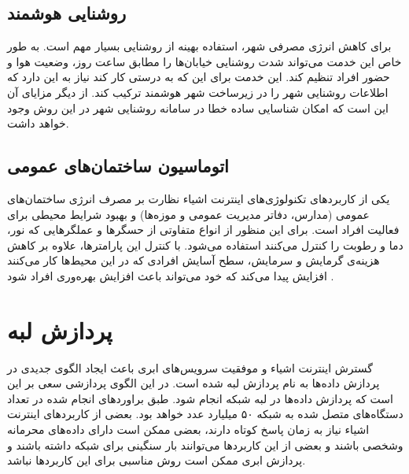     \subsection{روشنایی هوشمند}
      برای کاهش انرژی مصرفی شهر، استفاده بهینه از روشنایی بسیار مهم است.
      به طور خاص این خدمت می‌تواند شدت روشنایی خیابان‌ها را مطابق ساعت روز، وضعیت هوا و حضور افراد تنظیم کند.
      این خدمت برای این که به درستی کار کند نیاز به این دارد که اطلاعات روشنایی شهر را در زیرساخت شهر هوشمند ترکیب کند.
      از دیگر مزایای آن این است که امکان شناسایی ساده خطا در سامانه روشنایی شهر در این روش وجود خواهد داشت.

    \subsection{اتوماسیون ساختمان‌های عمومی}
      یکی از کاربرد‌های تکنولوژی‌های اینترنت اشیاء نظارت بر مصرف انرژی ساختمان‌های عمومی (مدارس، دفاتر مدیریت عمومی و موزه‌ها) و بهبود شرایط محیطی برای فعالیت افراد است.
      برای این منظور از انواع متفاوتی از حسگر‌ها و عملگر‌هایی که نور، دما و رطوبت را کنترل می‌کنند استفاده می‌شود.
      با کنترل این پارامتر‌ها، علاوه بر کاهش هزینه‌ی گرمایش و سرمایش، سطح آسایش افرادی که در این محیط‌ها کار می‌کنند افزایش پیدا می‌کند که خود می‌تواند باعث افزایش بهره‌وری افراد شود \cite{lee2008intelligent}.

  \section{پردازش لبه}
    گسترش اینترنت اشیاء و موفقیت سرویس‌های ابری باعث ایجاد الگو‌ی جدیدی در پردازش داده‌ها به نام پردازش لبه  شده است.
    در این الگوی پردازشی سعی بر این است که پردازش داده‌ها در لبه شبکه انجام شود.
    طبق براورد‌های انجام شده در \cite{2018cisco} تعداد دستگاه‌های متصل شده به شبکه ۵۰ میلیارد عدد خواهد بود.
    بعضی از کاربردهای اینترنت اشیاء نیاز به زمان پاسخ کوتاه دارند، بعضی ممکن است دارای داده‌های محرمانه وشخصی باشند و بعضی از این کاربرد‌ها می‌توانند بار سنگینی برای شبکه داشته باشند و پردازش ابری ممکن است روش مناسبی برای این کاربرد‌ها نباشد.


